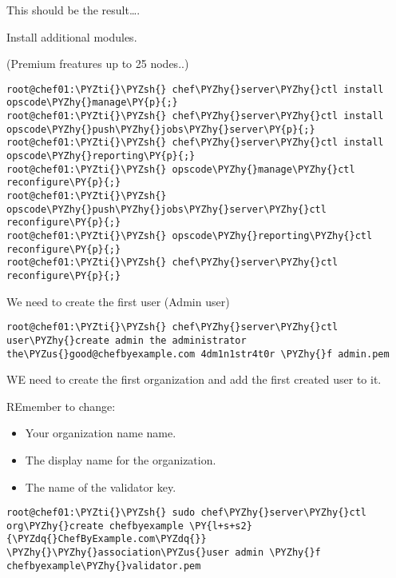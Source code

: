 
This should be the result\ldots{}.

Install additional modules.

(Premium freatures up to 25 nodes..)
\begin{codelisting}
\label{code:}
\codecaption{}
\begin{Verbatim}[fontsize=\relsize{-2.5},fontseries=b,commandchars=\\\{\}]
root@chef01:\PYZti{}\PYZsh{} chef\PYZhy{}server\PYZhy{}ctl install opscode\PYZhy{}manage\PY{p}{;}
root@chef01:\PYZti{}\PYZsh{} chef\PYZhy{}server\PYZhy{}ctl install opscode\PYZhy{}push\PYZhy{}jobs\PYZhy{}server\PY{p}{;}
root@chef01:\PYZti{}\PYZsh{} chef\PYZhy{}server\PYZhy{}ctl install opscode\PYZhy{}reporting\PY{p}{;}
root@chef01:\PYZti{}\PYZsh{} opscode\PYZhy{}manage\PYZhy{}ctl reconfigure\PY{p}{;}
root@chef01:\PYZti{}\PYZsh{} opscode\PYZhy{}push\PYZhy{}jobs\PYZhy{}server\PYZhy{}ctl reconfigure\PY{p}{;}
root@chef01:\PYZti{}\PYZsh{} opscode\PYZhy{}reporting\PYZhy{}ctl reconfigure\PY{p}{;} 
root@chef01:\PYZti{}\PYZsh{} chef\PYZhy{}server\PYZhy{}ctl reconfigure\PY{p}{;}
\end{Verbatim}
\end{codelisting}

We need to create the first user (Admin user)

\begin{codelisting}
\label{code:}
\codecaption{}
\begin{Verbatim}[fontsize=\relsize{-2.5},fontseries=b,commandchars=\\\{\}]
root@chef01:\PYZti{}\PYZsh{} chef\PYZhy{}server\PYZhy{}ctl user\PYZhy{}create admin the administrator the\PYZus{}good@chefbyexample.com 4dm1n1str4t0r \PYZhy{}f admin.pem
\end{Verbatim}
\end{codelisting}

WE need to create the first organization and add the first created user to it.

REmember to change:

\begin{itemize}
\item Your organization name name.
\item The display name for the organization.
\item The name of the validator key.
\end{itemize}

\begin{codelisting}
\label{code:}
\codecaption{}
\begin{Verbatim}[fontsize=\relsize{-2.5},fontseries=b,commandchars=\\\{\}]
root@chef01:\PYZti{}\PYZsh{} sudo chef\PYZhy{}server\PYZhy{}ctl org\PYZhy{}create chefbyexample \PY{l+s+s2}{\PYZdq{}ChefByExample.com\PYZdq{}} \PYZhy{}\PYZhy{}association\PYZus{}user admin \PYZhy{}f chefbyexample\PYZhy{}validator.pem
\end{Verbatim}
\end{codelisting}

